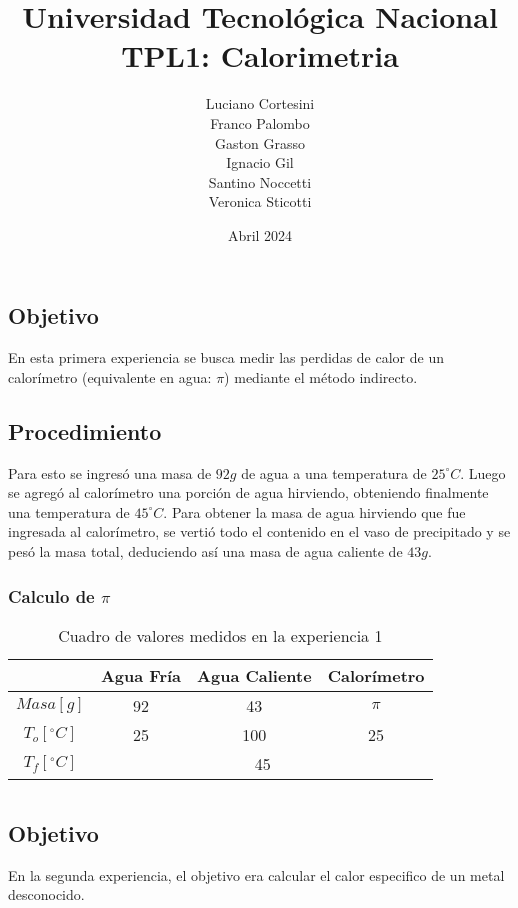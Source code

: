 \documentclass[12pt]{report}
\title{Universidad Tecnológica Nacional\\TPL1: Calorimetria}
\author{
Luciano Cortesini\\
Franco Palombo\\
Gaston Grasso\\
Ignacio Gil\\
Santino Noccetti\\
Veronica Sticotti
}
\date{Abril 2024}
\begin{document}
\maketitle

\chapter{}
\section{Objetivo}
En esta primera experiencia se busca medir las perdidas de calor de un calorímetro (equivalente en agua: $\pi$) mediante el método indirecto. 

\section{Procedimiento}
Para esto se ingresó una masa de $92 g$ de agua a una temperatura de $25^\circ C$.
Luego se agregó al calorímetro una porción de agua hirviendo, obteniendo finalmente una temperatura de  $45^\circ C$. 
Para obtener la masa de agua hirviendo que fue ingresada al calorímetro, se vertió todo el contenido en el vaso de precipitado y se pesó la masa total, deduciendo así una masa de agua caliente de $43g$.
\subsection{Calculo de $\pi$}
\begin{table}[htbp]
    \centering
    \begin{tabular}{|c|c|c|c|}
    \hline
    & Agua Fría & Agua Caliente & Calorímetro\\
    \hline
    $Masa[g]$ & 92 & 43 & $\pi$ \\
    \hline
   $T_o[^\circ C]$ & 25 & 100 & 25\\
    \hline
     $T_f[^\circ C]$ & \multicolumn{3}{|c|}{45}\\
    \hline
    \end{tabular}
    \caption{Cuadro de valores medidos en la experiencia 1}
    \label{tab:datos experiencia 1}
\end{table}

\chapter{}
\section{Objetivo}
En la segunda experiencia, el objetivo era calcular el calor especifico de un metal desconocido.
\end{document}
